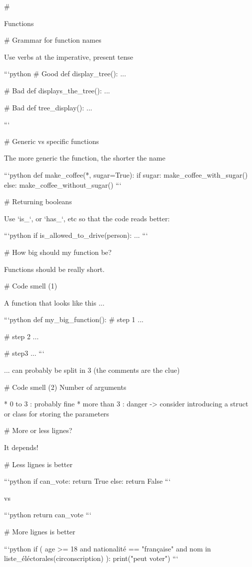 #

\huge \center Functions


# Grammar for function names

Use verbs at the imperative, present tense

```python
# Good
def display_tree():
    ...

# Bad
def displays_the_tree():
    ...

# Bad
def tree_display():
    ...

```

# Generic vs specific functions

The more generic the function, the shorter the name

```python
def make_coffee(*, sugar=True):
    if sugar:
        make_coffee_with_sugar()
   else:
        make_coffee_without_sugar()
```



# Returning booleans

Use `is_`, or `has_`, etc so that the code reads better:

```python
if is_allowed_to_drive(person):
    ...
```

# How big should my function be?

Functions should be really short.

# Code smell (1)

A function that looks like this ...

```python
def my_big_function():
    # step 1
    ...

    # step 2
    ...

    # step3
    ...
```

... can probably be split in 3 (the comments are the clue)

# Code smell (2)  Number of arguments

* 0 to 3 : probably fine
* more than 3 : danger -> consider introducing a struct or class for storing the parameters


# More or less lignes?

\center \large It depends!

# Less lignes is better

```python
if can_vote:
    return True
else:
    return False
```

vs

```python
return can_vote
```

# More lignes is better

```python
if (
    age >= 18
    and nationalité == "française"
    and nom in liste_éléctorales(circonscription)
):
    print("peut voter")
```

